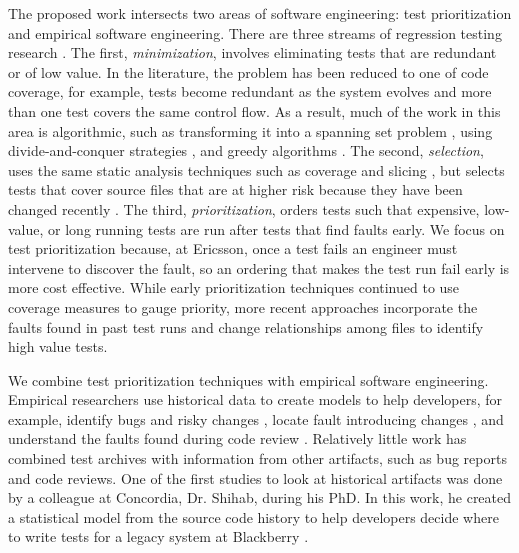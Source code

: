 \documentclass[12pt, letterpaper]{article}
\begin{document}
The proposed work intersects two areas of software engineering: test
prioritization and empirical software engineering. 
%
There are three streams of regression testing research \cite{Yoo2012STVR}.
%
%
The first, {\it minimization}, involves eliminating tests that are redundant or
of low value. In the literature, the problem has been reduced to one of code
coverage, for example, tests become redundant as the system evolves and more
than one test covers the same control flow. As a result, much of the work in
this area is algorithmic, such as transforming it into a spanning set problem
\cite{Marre2003TSE}, using divide-and-conquer strategies \cite{Chen1996IPL},
and greedy algorithms \cite{Tallam2005SENotes}. 
%
The second, {\it selection}, uses the same static analysis techniques such as
coverage \cite{Taha1989COMPSAC} and slicing \cite{Jeffrey2006COMPSAC}, but
selects tests that cover source files that are at higher risk because they have
been changed recently \cite{Rothermel1994ICSE}. 
%
The third, {\it prioritization}, orders tests such that expensive, low-value,
or long running tests are run after tests that find faults early.  We
focus on test prioritization because, at Ericsson, once a test fails an
engineer must intervene to discover the fault, so an ordering that makes the
test run fail early is more cost effective.
While early prioritization techniques continued to use coverage measures to
gauge priority, more recent approaches incorporate the faults found in past
test runs \cite{Kim2002ICSE} and change relationships among files
\cite{Sherriff2007ISSRE} to identify high value tests. 
%

We combine test prioritization techniques with empirical software engineering.
Empirical researchers use historical data to create models to help developers,
for example, identify bugs and risky changes \cite{DAmbros2010MSR}, locate
fault introducing changes \cite{Kim2006ASE}, and understand the faults found during
code review \cite{Rigby2014TOSEM}.
Relatively little work has combined test archives with information from other
artifacts, such as bug reports and code reviews. One of the first studies to
look at historical artifacts was done by a colleague at Concordia, Dr. Shihab,
during his PhD. In this work, he created a statistical model from the source
code history to help developers decide where to write tests for a legacy system
at Blackberry \cite{Shihab2011SPE}.
\end{document}
